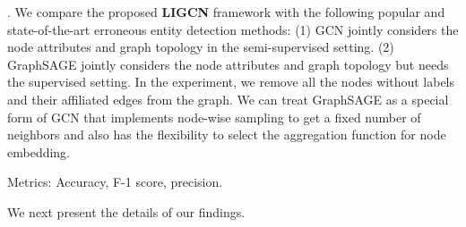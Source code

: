 . We compare the proposed \textbf {LIGCN} framework with the following popular and state-of-the-art erroneous entity detection methods:
(1) GCN \cite{kipf2016semi} jointly considers the node attributes and graph topology in the semi-supervised setting.
(2) GraphSAGE \cite{hamilton2017inductive} jointly considers the node attributes and graph topology but needs the supervised setting. In the experiment, we remove all the nodes without labels and their affiliated edges from the graph. We can treat GraphSAGE as a special form of GCN that implements node-wise sampling to get a fixed number of neighbors and also has the flexibility to select the aggregation function for node embedding.

Metrics: Accuracy, F-1 score, precision.

We next present the details of our findings.


